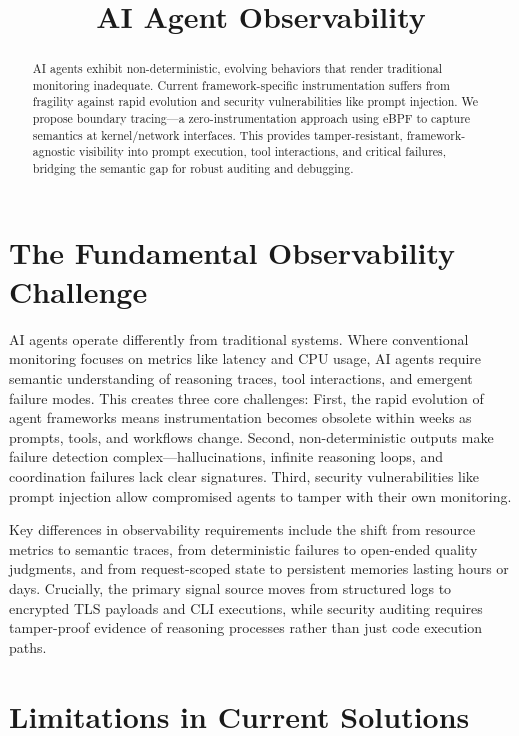 \documentclass[sigplan,screen，review,9pt]{acmart}
\begin{document}
\title{AI Agent Observability}


\author{}


\sloppy
\begin{abstract}
AI agents exhibit non-deterministic, evolving behaviors that render traditional monitoring inadequate. Current framework-specific instrumentation suffers from fragility against rapid evolution and security vulnerabilities like prompt injection. We propose boundary tracing—a zero-instrumentation approach using eBPF to capture semantics at kernel/network interfaces. This provides tamper-resistant, framework-agnostic visibility into prompt execution, tool interactions, and critical failures, bridging the semantic gap for robust auditing and debugging.
\end{abstract}


\maketitle



\section{The Fundamental Observability Challenge}

AI agents operate differently from traditional systems. Where conventional monitoring focuses on metrics like latency and CPU usage, AI agents require semantic understanding of reasoning traces, tool interactions, and emergent failure modes. This creates three core challenges: First, the rapid evolution of agent frameworks means instrumentation becomes obsolete within weeks as prompts, tools, and workflows change. Second, non-deterministic outputs make failure detection complex—hallucinations, infinite reasoning loops, and coordination failures lack clear signatures. Third, security vulnerabilities like prompt injection allow compromised agents to tamper with their own monitoring.

Key differences in observability requirements include the shift from resource metrics to semantic traces, from deterministic failures to open-ended quality judgments, and from request-scoped state to persistent memories lasting hours or days. Crucially, the primary signal source moves from structured logs to encrypted TLS payloads and CLI executions, while security auditing requires tamper-proof evidence of reasoning processes rather than just code execution paths.


\section{Limitations in Current Solutions}
\end{document}

